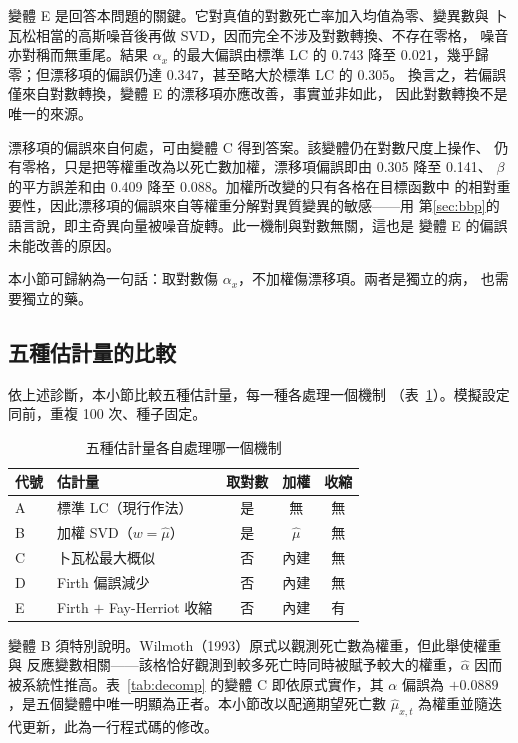 \documentclass[UTF8, fontset=macnew, a4paper, 12pt]{ctexart}
\begin{document}
變體 E 是回答本問題的關鍵。它對真值的對數死亡率加入均值為零、變異數與
卜瓦松相當的高斯噪音後再做 SVD，因而完全不涉及對數轉換、不存在零格，
噪音亦對稱而無重尾。結果 $\alpha_x$ 的最大偏誤由標準 LC 的 0.743 降至
0.021，幾乎歸零；但漂移項的偏誤仍達 0.347，甚至略大於標準 LC 的 0.305。
換言之，若偏誤僅來自對數轉換，變體 E 的漂移項亦應改善，事實並非如此，
因此對數轉換不是唯一的來源。

漂移項的偏誤來自何處，可由變體 C 得到答案。該變體仍在對數尺度上操作、
仍有零格，只是把等權重改為以死亡數加權，漂移項偏誤即由 0.305 降至 0.141、
$\beta$ 的平方誤差和由 0.409 降至 0.088。加權所改變的只有各格在目標函數中
的相對重要性，因此漂移項的偏誤來自等權重分解對異質變異的敏感——用
第\ref{sec:bbp}的語言說，即主奇異向量被噪音旋轉。此一機制與對數無關，這也是
變體 E 的偏誤未能改善的原因。

本小節可歸納為一句話：取對數傷 $\alpha_x$，不加權傷漂移項。兩者是獨立的病，
也需要獨立的藥。

\subsection{五種估計量的比較}\label{sec:est}

依上述診斷，本小節比較五種估計量，每一種各處理一個機制
（表~\ref{tab:estdesign}）。模擬設定同前，重複 100 次、種子固定。

\begin{table}[H]
  \centering
  \caption{五種估計量各自處理哪一個機制}
  \label{tab:estdesign}
  \small
  \begin{tabular}{llccc}
    \toprule
    代號 & 估計量 & 取對數 & 加權 & 收縮 \\
    \midrule
    A & 標準 LC（現行作法）        & 是 & 無     & 無 \\
    B & 加權 SVD（$w=\hat\mu$）    & 是 & $\hat\mu$ & 無 \\
    C & 卜瓦松最大概似             & 否 & 內建   & 無 \\
    D & Firth 偏誤減少             & 否 & 內建   & 無 \\
    E & Firth $+$ Fay-Herriot 收縮 & 否 & 內建   & 有 \\
    \bottomrule
  \end{tabular}
\end{table}

變體 B 須特別說明。Wilmoth（1993）原式以觀測死亡數為權重，但此舉使權重與
反應變數相關——該格恰好觀測到較多死亡時同時被賦予較大的權重，$\hat\alpha$
因而被系統性推高。表~\ref{tab:decomp} 的變體 C 即依原式實作，其 $\alpha$
偏誤為 $+0.0889$，是五個變體中唯一明顯為正者。本小節改以配適期望死亡數
$\hat\mu_{x,t}$ 為權重並隨迭代更新，此為一行程式碼的修改。
\end{document}
